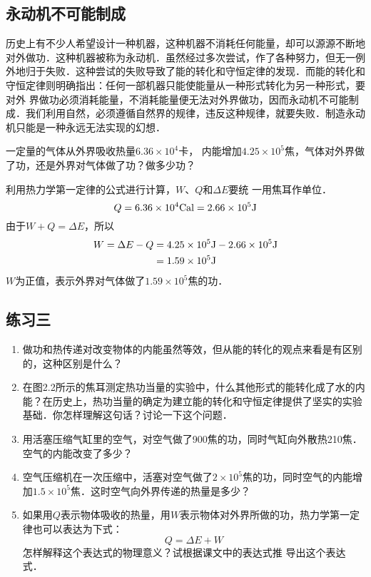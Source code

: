 \subsection{永动机不可能制成} 
历史上有不少人希望设计一种机器，这种机器不消耗任何能量，却可以源源不断地对外做功．这种机器被称为永动机．虽然经过多次尝试，作了各种努力，但无一例外地归于失败．这种尝试的失败导致了能的转化和守恒定律的发现．而能的转化和守恒定律则明确指出：任何一部机器只能使能量从一种形式转化为另一种形式，要对外
界做功必须消耗能量，不消耗能量便无法对外界做功，因而永动机不可能制成．我们利用自然，必须遵循自然界的规律，违反这种规律，就要失败．制造永动机只能是一种永远无法实现的幻想．

\begin{example}
	一定量的气体从外界吸收热量$6.36\times 10^4$卡，
内能增加$4.25\times 10^5$焦，气体对外界做了功，还是外界对气体做了功？做多少功？	
\end{example}

\begin{solution}
利用热力学第一定律的公式进行计算，$W$、$Q$和$\Delta E$要统
一用焦耳作单位．
\[Q=6.36\times 10^{4}{\rm Cal}=2.66\times 10^5{\rm J}\]
由于$W+Q=\Delta E$，所以
\[\begin{split}
W=\Delta E-Q&=4.25 \times 10^5{\rm J}-2.66\times 10^5{\rm J}\\
&=1.59\times 10^5{\rm J}
\end{split} \]
$W$为正值，表示外界对气体做了$1.59\times 10^5$焦的功．
\end{solution}

\subsection*{练习三}
\begin{enumerate}
		\item 做功和热传递对改变物体的内能虽然等效，但从能的转化的观点来看是有区别的，这种区别是什么？
	\item 在图2.2所示的焦耳测定热功当量的实验中，什么其他形式的能转化成了水的内能？在历史上，热功当量的确定为建立能的转化和守恒定律提供了坚实的实验基础．你怎样理解这句话？讨论一下这个问题．
	\item 用活塞压缩气缸里的空气，对空气做了900焦的功，同时气缸向外散热210焦．空气的内能改变了多少？
	\item 空气压缩机在一次压缩中，活塞对空气做了$2\times 10^5$焦的功，同时空气的内能增加$1.5\times 10^5$焦．这时空气向外界传递的热量是多少？
	\item 如果用$Q$表示物体吸收的热量，用$W$表示物体对外界所做的功，热力学第一定律也可以表达为下式：
	\[Q=\Delta E+W\]
	怎样解释这个表达式的物理意义？试根据课文中的表达式推
导出这个表达式．
\end{enumerate}

